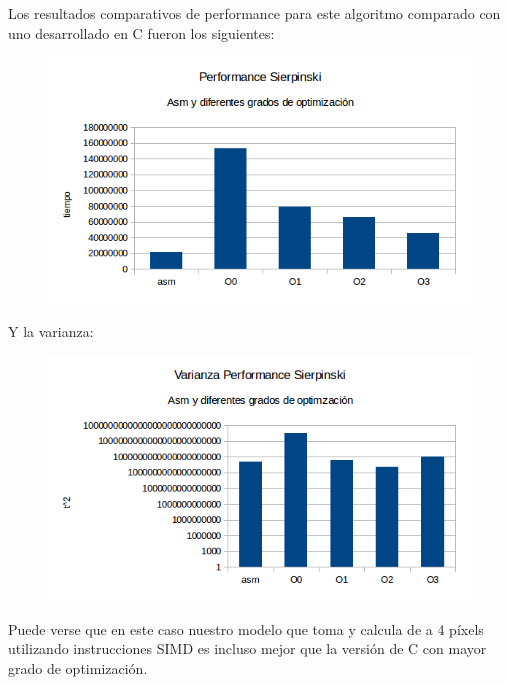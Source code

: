 \documentclass[a4paper]{article}
\begin{document}
Los resultados comparativos de performance para este algoritmo comparado con uno desarrollado en C fueron los siguientes:

\begin{figure}[h!]
  \begin{center}
  \includegraphics[scale=0.66]{Graficos1.4/sie/per.png}
  \label{nombreparareferenciar7}
  \end{center}
\end{figure}

\newpage

Y la varianza:

\begin{figure}[h!]
  \begin{center}
  \includegraphics[scale=0.66]{Graficos1.4/sie/var.png}
  \label{nombreparareferenciar8}
  \end{center}
\end{figure}

Puede verse que en este caso nuestro modelo que toma y calcula de a 4 píxels utilizando instrucciones SIMD es incluso mejor que la versión de C con mayor grado de optimización.
\end{document}
